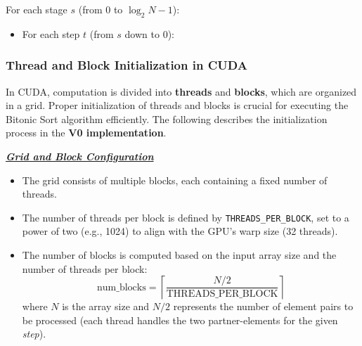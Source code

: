 \documentclass[12pt]{article}
\renewenvironment{examplebox}[1]{%
  \ifthenelse{\boolean{showexamples}}%
    {\begin{tcolorbox}[colback=white, colframe=gray!30, title={#1}, sharp corners, boxrule=0.5pt, coltitle=black]}%
    {\expandafter\comment}%
}{%
  \ifthenelse{\boolean{showexamples}}%
    {\end{tcolorbox}}%
    {\expandafter\endcomment}%
}
\begin{document}
For each stage \( s \) (from \( 0 \) to \( \log_2 N - 1 \)):
\begin{itemize}[nosep]
    \item For each step \( t \) (from \( s \) down to \( 0 \)):
\end{itemize}


\subsubsection{Thread and Block Initialization in CUDA}

In CUDA, computation is divided into \textbf{threads} and \textbf{blocks}, which are organized in a grid. Proper initialization of threads and blocks is crucial for executing the Bitonic Sort algorithm efficiently. The following describes the initialization process in the \textbf{V0 implementation}.

\vspace{+5pt}

\textbf{\underline{\textit{Grid and Block Configuration}}}
\begin{itemize}[nosep]
    \item The grid consists of multiple blocks, each containing a fixed number of threads.
    \item The number of threads per block is defined by \texttt{THREADS\_PER\_BLOCK}, set to a power of two (e.g., 1024) to align with the GPU’s warp size (32 threads).
    \item The number of blocks is computed based on the input array size and the number of threads per block:
    \[
    \text{num\_blocks} = \left\lceil \frac{N / 2}{\text{THREADS\_PER\_BLOCK}} \right\rceil
    \]
    where \( N \) is the array size and \( N / 2 \) represents the number of element pairs to be processed (each thread handles the two partner-elements for the given \textit{step}).
\end{itemize}
\end{document}
